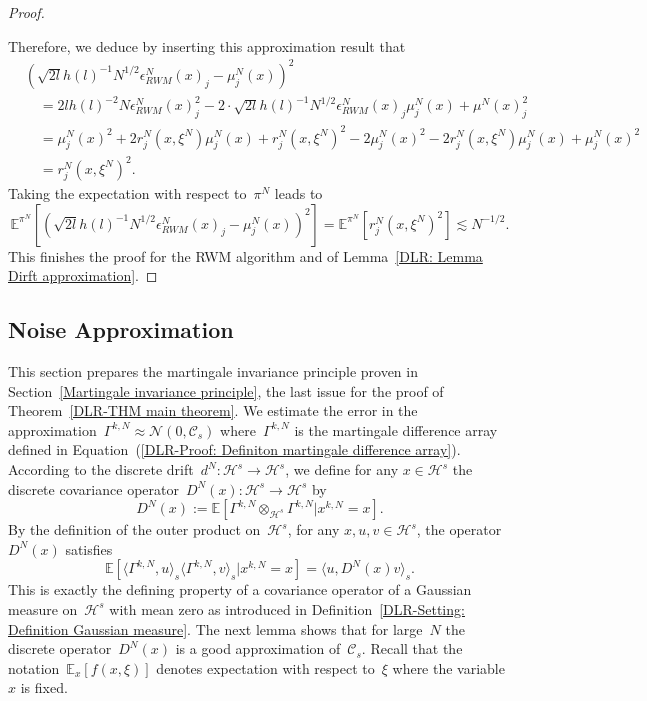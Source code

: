 \begin{proof}
\begin{rem}
 \end{rem}
 Therefore, we deduce by inserting this approximation result that
 \begin{align*}
   & (\sqrt{2l}  h(l)^{-1} N^{1/2} \epsilon_{RWM}^N (x)_j - \mu^N_j(x) )^2 \\
   & \quad = 2l h(l)^{-2} N \epsilon_{RWM}^N (x)_j^2 - 2 \cdot \sqrt{2l} h(l)^{-1} N^{1/2} \epsilon_{RWM}^N (x)_j \mu^N_j (x) +  \mu^N (x)_j^2 \\
   & \quad =  \mu^N_j (x)^2 + 2 r^N_j(x, \xi^N)\mu^N_j (x) + r^N_j(x, \xi^N)^2 - 2 \mu^N_j (x)^2 - 2 r^N_j(x, \xi^N)\mu^N_j (x) +  \mu^N_j (x)^2 \\
   & \quad = r^N_j(x, \xi^N)^2.
 \end{align*}
 Taking the expectation with respect to~$\pi^N$ leads to
 \begin{equation*}
   \mathbb{E}^{\pi^N}[ (\sqrt{2l}  h(l)^{-1} N^{1/2} \epsilon_{RWM}^N (x)_j - \mu^N_j(x))^2 ] = \mathbb{E}^{\pi^N}[ r^N_j(x, \xi^N)^2] \lesssim N^{-1/2}.
 \end{equation*}
 This finishes the proof for the RWM algorithm and of Lemma~\ref{DLR: Lemma Dirft approximation}.
 
\end{proof}



\subsection{Noise Approximation}
\label{sec:sub:DLR - Noise Approximation}

This section prepares the martingale invariance principle proven in Section~\ref{Martingale invariance principle}, the last issue for the proof of Theorem~\ref{DLR-THM main theorem}. We estimate the error in the approximation~$\Gamma^{k,N} \approx \mathcal{N}(0, \mathcal{C}_s)$ where~$\Gamma^{k,N}$ is the martingale difference array defined in Equation~(\ref{DLR-Proof: Definiton martingale difference array}). According to the discrete drift~$d^N : \mathcal{H}^s \to \mathcal{H}^s$, we define for any $x \in \mathcal{H}^s$ the discrete covariance operator~$D^N(x) : \mathcal{H}^s \to \mathcal{H}^s$ by
\begin{equation*}
  D^N(x) := \mathbb{E}[ \Gamma^{k,N} \otimes_{\mathcal{H}^s} \Gamma^{k,N}| x^{k,N} = x].
\end{equation*}
By the definition of the outer product on~$\mathcal{H}^s$, for any $x, u, v \in \mathcal{H}^s$, the operator~$D^N(x)$ satisfies
\begin{equation*}
  \mathbb{E}[\langle \Gamma^{k,N}, u \rangle_s \langle  \Gamma^{k,N}, v \rangle_s| x^{k,N} = x] = \langle u, D^N(x) v \rangle_s.
\end{equation*}
This is exactly the defining property of a covariance operator of a Gaussian measure on~$\mathcal{H}^s$ with mean zero as introduced in Definition~\ref{DLR-Setting: Definition Gaussian measure}. The next lemma shows that for large~$N$ the discrete operator~$D^N(x)$ is a good approximation of~$\mathcal{C}_s$. Recall that the notation~$\mathbb{E}_x[f(x,\xi)]$ denotes expectation with respect to~$\xi$ where the variable~$x$ is fixed. 

